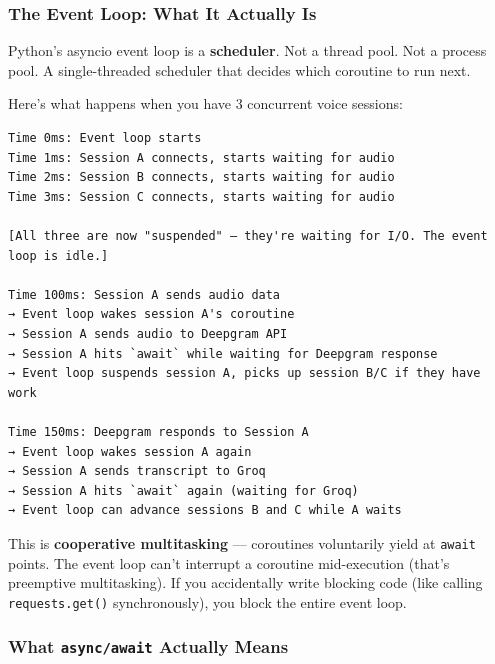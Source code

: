 \documentclass[
  11pt,
]{article}
\newcommand{\passthrough}[1]{#1}
\begin{document}
\hypertarget{the-event-loop-what-it-actually-is}{%
\subsubsection{The Event Loop: What It Actually
Is}\label{the-event-loop-what-it-actually-is}}

Python's asyncio event loop is a \textbf{scheduler}. Not a thread pool.
Not a process pool. A single-threaded scheduler that decides which
coroutine to run next.

Here's what happens when you have 3 concurrent voice sessions:

\begin{lstlisting}
Time 0ms: Event loop starts
Time 1ms: Session A connects, starts waiting for audio
Time 2ms: Session B connects, starts waiting for audio  
Time 3ms: Session C connects, starts waiting for audio

[All three are now "suspended" — they're waiting for I/O. The event loop is idle.]

Time 100ms: Session A sends audio data
→ Event loop wakes session A's coroutine
→ Session A sends audio to Deepgram API
→ Session A hits `await` while waiting for Deepgram response
→ Event loop suspends session A, picks up session B/C if they have work

Time 150ms: Deepgram responds to Session A
→ Event loop wakes session A again
→ Session A sends transcript to Groq
→ Session A hits `await` again (waiting for Groq)
→ Event loop can advance sessions B and C while A waits
\end{lstlisting}

This is \textbf{cooperative multitasking} --- coroutines voluntarily
yield at \passthrough{\lstinline!await!} points. The event loop can't
interrupt a coroutine mid-execution (that's preemptive multitasking). If
you accidentally write blocking code (like calling
\passthrough{\lstinline!requests.get()!} synchronously), you block the
entire event loop.

\hypertarget{what-asyncawait-actually-means}{%
\subsubsection{\texorpdfstring{What \texttt{async/await} Actually
Means}{What async/await Actually Means}}\label{what-asyncawait-actually-means}}
\end{document}
